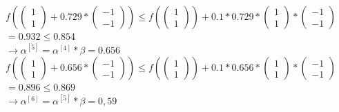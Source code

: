 \documentclass[naustrian]{article}
\begin{document}
{\begin{enumerate}
	$f( \left( \begin{array}{c} 1 \\ 1 \end{array} \right) + 0.729 * \left( \begin{array}{c} -1 \\ -1 \end{array} \right)) \leq f(\left( \begin{array}{c} 1 \\ 1 \end{array} \right)) + 0.1 * 0.729 *  \left( \begin{array}{c} 1 \\ 1 \end{array} \right) * \left( \begin{array}{c} -1 \\ -1 \end{array} \right)$ \\
	$= 0.932 \leq 0.854$ \\
	$\rightarrow \alpha^{[5]} = \alpha^{[4]} * \beta = 0.656$ \\

    $f( \left( \begin{array}{c} 1 \\ 1 \end{array} \right) + 0.656 * \left( \begin{array}{c} -1 \\ -1 \end{array} \right)) \leq f(\left( \begin{array}{c} 1 \\ 1 \end{array} \right)) + 0.1 * 0.656 *  \left( \begin{array}{c} 1 \\ 1 \end{array} \right) * \left( \begin{array}{c} -1 \\ -1 \end{array} \right)$ \\
    $= 0.896 \leq 0.869$ \\
    $\rightarrow \alpha^{[6]} = \alpha^{[5]} * \beta = 0,59$ \\


\end{enumerate}}
\end{document}
